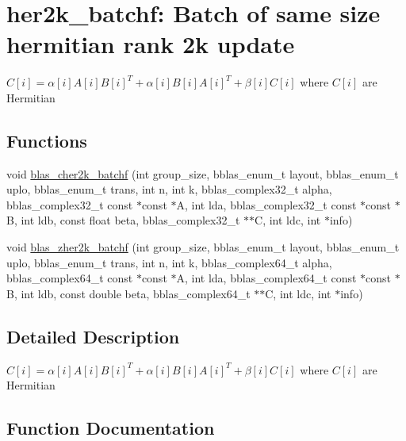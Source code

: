 \hypertarget{group__her2k__batchf}{}\section{her2k\+\_\+batchf\+: Batch of same size hermitian rank 2k update}
\label{group__her2k__batchf}


$ C[i] = \alpha[i] A[i] B[i]^T + \alpha[i] B[i] A[i]^T + \beta[i] C[i] $ where $ C[i] $ are Hermitian  


\subsection*{Functions}
\begin{DoxyCompactItemize}
\item 
void \hyperlink{group__her2k__batchf_ga667de74c541bf4b6991302ad000643ab}{blas\+\_\+cher2k\+\_\+batchf} (int group\+\_\+size, bblas\+\_\+enum\+\_\+t layout, bblas\+\_\+enum\+\_\+t uplo, bblas\+\_\+enum\+\_\+t trans, int n, int k, bblas\+\_\+complex32\+\_\+t alpha, bblas\+\_\+complex32\+\_\+t const $\ast$const $\ast$A, int lda, bblas\+\_\+complex32\+\_\+t const $\ast$const $\ast$B, int ldb, const float beta, bblas\+\_\+complex32\+\_\+t $\ast$$\ast$C, int ldc, int $\ast$info)
\item 
void \hyperlink{group__her2k__batchf_ga809637abe18dd60393b5d0f1baa11dc8}{blas\+\_\+zher2k\+\_\+batchf} (int group\+\_\+size, bblas\+\_\+enum\+\_\+t layout, bblas\+\_\+enum\+\_\+t uplo, bblas\+\_\+enum\+\_\+t trans, int n, int k, bblas\+\_\+complex64\+\_\+t alpha, bblas\+\_\+complex64\+\_\+t const $\ast$const $\ast$A, int lda, bblas\+\_\+complex64\+\_\+t const $\ast$const $\ast$B, int ldb, const double beta, bblas\+\_\+complex64\+\_\+t $\ast$$\ast$C, int ldc, int $\ast$info)
\end{DoxyCompactItemize}


\subsection{Detailed Description}
$ C[i] = \alpha[i] A[i] B[i]^T + \alpha[i] B[i] A[i]^T + \beta[i] C[i] $ where $ C[i] $ are Hermitian 



\subsection{Function Documentation}
